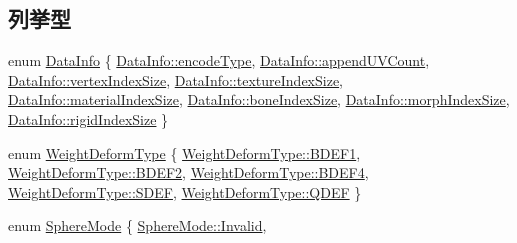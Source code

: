 \subsection*{列挙型}
\begin{DoxyCompactItemize}
\item 
enum \mbox{\hyperlink{namespace_p_m_x_ac1ad92ba004e39031c2a870b9a4a3e26}{Data\+Info}} \{ \newline
\mbox{\hyperlink{namespace_p_m_x_ac1ad92ba004e39031c2a870b9a4a3e26ae82b6153b4ea2340333e2254c3553d03}{Data\+Info\+::encode\+Type}}, 
\mbox{\hyperlink{namespace_p_m_x_ac1ad92ba004e39031c2a870b9a4a3e26a621901746aa9045eb790b0a86682cb17}{Data\+Info\+::append\+U\+V\+Count}}, 
\mbox{\hyperlink{namespace_p_m_x_ac1ad92ba004e39031c2a870b9a4a3e26aad975dd7d541917dfb55352f49606298}{Data\+Info\+::vertex\+Index\+Size}}, 
\mbox{\hyperlink{namespace_p_m_x_ac1ad92ba004e39031c2a870b9a4a3e26a1d67c77bbbb57b83046a3ca75bc52a7f}{Data\+Info\+::texture\+Index\+Size}}, 
\newline
\mbox{\hyperlink{namespace_p_m_x_ac1ad92ba004e39031c2a870b9a4a3e26a2d1a8f688c53ca2cd7f205e92bb71201}{Data\+Info\+::material\+Index\+Size}}, 
\mbox{\hyperlink{namespace_p_m_x_ac1ad92ba004e39031c2a870b9a4a3e26a820b0437d5f65080dc27e767d7601e52}{Data\+Info\+::bone\+Index\+Size}}, 
\mbox{\hyperlink{namespace_p_m_x_ac1ad92ba004e39031c2a870b9a4a3e26a8711b7bf61b485fdb9460c1c4b12598b}{Data\+Info\+::morph\+Index\+Size}}, 
\mbox{\hyperlink{namespace_p_m_x_ac1ad92ba004e39031c2a870b9a4a3e26ad6477628bf278aa5dffcba8a979a6ed7}{Data\+Info\+::rigid\+Index\+Size}}
 \}
\item 
enum \mbox{\hyperlink{namespace_p_m_x_a1a0e8dce30cb158a0c0d66cea0bf0f51}{Weight\+Deform\+Type}} \{ \newline
\mbox{\hyperlink{namespace_p_m_x_a1a0e8dce30cb158a0c0d66cea0bf0f51aa0a2170fca2ac16aabeb5719e5550fa0}{Weight\+Deform\+Type\+::\+B\+D\+E\+F1}}, 
\mbox{\hyperlink{namespace_p_m_x_a1a0e8dce30cb158a0c0d66cea0bf0f51a18ec8eee38df4ed4cc42bc22404b0230}{Weight\+Deform\+Type\+::\+B\+D\+E\+F2}}, 
\mbox{\hyperlink{namespace_p_m_x_a1a0e8dce30cb158a0c0d66cea0bf0f51a2ee4067584a99b99b0e689fcff674639}{Weight\+Deform\+Type\+::\+B\+D\+E\+F4}}, 
\mbox{\hyperlink{namespace_p_m_x_a1a0e8dce30cb158a0c0d66cea0bf0f51a72f8506348aacaa037e9e4dac38e2f82}{Weight\+Deform\+Type\+::\+S\+D\+EF}}, 
\newline
\mbox{\hyperlink{namespace_p_m_x_a1a0e8dce30cb158a0c0d66cea0bf0f51a432369fbbc05ed17287290ed1e50e9a4}{Weight\+Deform\+Type\+::\+Q\+D\+EF}}
 \}
\item 
enum \mbox{\hyperlink{namespace_p_m_x_aa20aa54267af9c3267c70e45f292aa9b}{Sphere\+Mode}} \{ \mbox{\hyperlink{namespace_p_m_x_aa20aa54267af9c3267c70e45f292aa9ba4bbb8f967da6d1a610596d7257179c2b}{Sphere\+Mode\+::\+Invalid}}, 

\end{DoxyCompactItemize}
